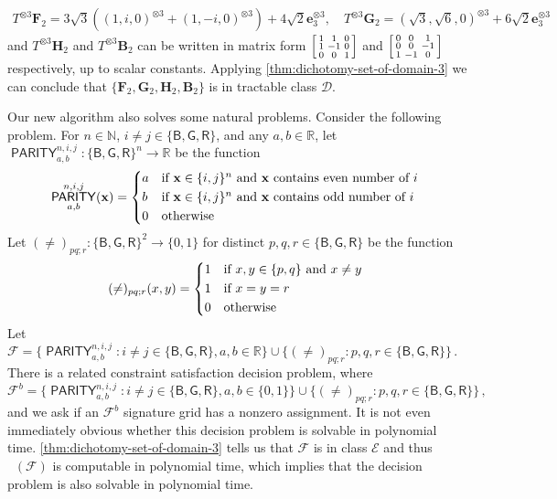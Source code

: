 \documentclass[11pt]{article}
\DeclareMathOperator{\holts}{Holant^*_3}
\DeclareMathOperator{\parf}{\mathsf{PARITY}}
\newcommand{\db}{\mathsf{B}}
\newcommand{\dg}{\mathsf{G}}
\newcommand{\dr}{\mathsf{R}}
\newcommand{\teh}{^{\otimes 3}}
\newcommand{\tractBGR}{$\mathscr{D}$\xspace}
\newcommand{\tractBGGRBR}{$\mathscr{E}$\xspace}
\begin{document}
{\small
\begin{align*}
    T \teh \mathbf{F}_2 = 3 \sqrt{3} ((1, i, 0)\teh + (1, -i, 0)\teh) + 4 \sqrt{2} \mathbf{e}_3\teh , \quad
    T \teh \mathbf{G}_2 = (\sqrt{3}, \sqrt{6}, 0)\teh + 6 \sqrt{2} \mathbf{e}_3\teh 
\end{align*}
}
and $T\teh \mathbf{H}_2$ and $T\teh \mathbf{B}_2$ can be written in matrix form $\begin{bsmallmatrix}
        1 & 1 & 0 \\
        1 & -1 & 0 \\
        0 & 0 & 1
    \end{bsmallmatrix}$ and $\begin{bsmallmatrix}
    0 & 0 & 1 \\ 
    0 & 0 & -1 \\
    1 & -1 & 0
    \end{bsmallmatrix}$ respectively, up to scalar constants.
Applying  \cref{thm:dichotomy-set-of-domain-3}
we can conclude  that $\{\mathbf{F}_2, \mathbf{G}_2, \mathbf{H}_2, \mathbf{B}_2\}$ is 
in tractable class \tractBGR. 


Our new algorithm also solves some natural problems.
Consider the following problem.
For $n \in \mathbb{N}$, $i \ne j \in \{\db, \dg, \dr\}$, and any $a, b \in \mathbb{R}$, let $\parf^{n, i, j}_{a, b} : \{\db, \dg, \dr\}^n \to \mathbb{R}$ be the function
{\small
\[
\parf^{n, i, j}_{a, b} (\mathbf{x}) = \begin{cases*}
    a & if $\mathbf{x} \in \{i, j\}^n$ and $\mathbf{x}$ contains even number of $i$ \\
    b & if $\mathbf{x} \in \{i, j\}^n$ and $\mathbf{x}$ contains odd number of $i$ \\
    0 & otherwise
\end{cases*}
\]
}
Let $(\ne)_{pq;r} : \{\db, \dg, \dr\}^2 \to \{0, 1\}$ for distinct $p, q, r \in \{\db, \dg, \dr \}$ be the function
{\small
\[
(\ne)_{pq;r}(x, y) = \begin{cases*}
    1 & if $x, y \in \{p, q\}$ and $x \ne y$ \\
    1 & if $x = y = r$ \\
    0 & otherwise
\end{cases*}
\]
}
Let 
\(\mathcal{F} = \{ \parf^{n, i, j}_{a, b} : i \ne j \in \{\db, \dg, \dr\}, a, b \in \mathbb{R}  \} \cup \{ (\ne)_{pq;r} : p, q, r \in \{\db, \dg, \dr\}  \} \, . \)
There is a related constraint satisfaction decision problem, where 
\[\mathcal{F}^b = \{ \parf^{n, i, j}_{a, b} : i \ne j \in \{\db, \dg, \dr\}, a, b \in \{0, 1\}  \} \cup \{ (\ne)_{pq;r} : p, q, r \in \{\db, \dg, \dr\}  \} \, , \]
and we ask if an $\mathcal{F}^b$ signature grid has a nonzero assignment. 
It is not even immediately obvious whether this decision problem is solvable in polynomial time.
\cref{thm:dichotomy-set-of-domain-3} tells us that $\mathcal{F}$ is in class \tractBGGRBR and thus $\holts(\mathcal{F})$ is computable in polynomial time, which implies that the decision problem is also solvable in polynomial time. 
\end{document}
